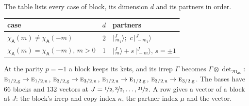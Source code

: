 \documentclass[10pt,a4paper]{article}
\numberwithin{equation}{section}
\newcommand{\grp}[1]{\mathsf{#1}}
\newcommand{\irr}[1]{\text{\normalfont\scshape #1}}
\newcommand{\ptag}[1]{\mathrm{#1}}
\newcommand{\chiA}{\chi_{\grp{A}}}
\newcommand{\irrprod}{\otimes}
\newcommand{\mult}{\kappa}
\newcommand{\intx}{\mu}
\newcommand{\jm}[2]{\bigl\lvert{}^{#1}_{\,#2}\bigr\rangle}
\begin{document}
\leavevmode\label{n:head.case}\label{n:head.partners}The table lists every case of block, its dimension $d$ and its partners in order.
\begin{center}\begin{tabular}{@{}lrl@{}}\toprule
case & $d$ & partners\\\midrule
$\chiA(m) \ne \chiA(-m)$ & 2 & $\jm{J}{m_1}$;\ $c\,\jm{J}{-m_1}$\\
$\chiA(m) = \chiA(-m)$, $m > 0$ & 1 & $\jm{J}{m} + s\,\jm{J}{-m}$, $s = \pm1$\\
\bottomrule\end{tabular}\end{center}
At the parity $p = -1$ a block keeps its kets, and its irrep $\Gamma$ becomes $\Gamma \irrprod \det_{\grp{2D_{4h}}}$: $\irr{e}_{1/2,\ptag{g}} \to \irr{e}_{1/2,\ptag{u}}$, $\irr{e}_{3/2,\ptag{g}} \to \irr{e}_{3/2,\ptag{u}}$, $\irr{e}_{1/2,\ptag{u}} \to \irr{e}_{1/2,\ptag{g}}$, $\irr{e}_{3/2,\ptag{u}} \to \irr{e}_{3/2,\ptag{g}}$.
The bases have 66 blocks and 132 vectors at $J = \nicefrac{1}{2}, \nicefrac{3}{2}, \dots, \nicefrac{21}{2}$. \label{n:head.vector}A row gives a vector of a block at $J$: the block's irrep and copy index $\mult$, the partner index $\intx$ and the vector.
\end{document}

